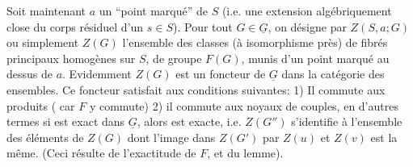 Soit maintenant $a$ un ``point marqué'' de $S$ (i.e. une extension algébriquement close du corps résiduel d'un $s\in S$). Pour tout $G\in\underline G$, on désigne par $Z(S,a;G)$ ou simplement $Z(G)$ l'ensemble des classes (à isomorphisme près) de fibrés principaux homogènes sur $S$, de groupe $F(G)$, munis d'un point marqué au dessus de $a$. Evidemment $Z(G)$ est un foncteur de $\underline G$ dans la catégorie des ensembles. Ce foncteur satisfait aux conditions suivantes: 1) Il commute aux produits ( car $F$ y commute) 2) il commute aux noyaux de couples, en d'autres termes si
est exact dans $\underline G$, alors
est exacte, i.e. $Z(G'')$ s'identifie à l'ensemble des éléments de $Z(G)$ dont l'image dans $Z(G')$ par $Z(u)$ et $Z(v)$ est la même. (Ceci résulte de l'exactitude de $F$, et du lemme).
